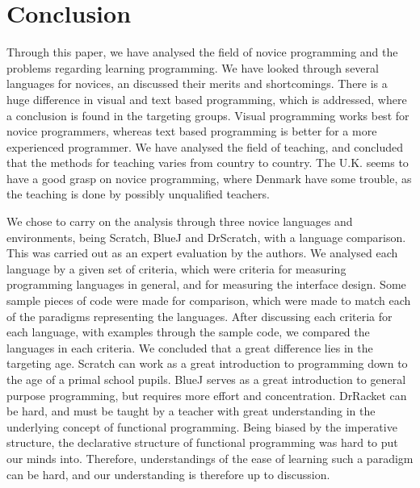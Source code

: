 \chapter{Conclusion}
\label{chap:conclusion}

Through this paper, we have analysed the field of novice programming and the problems regarding learning programming. We have looked through several languages for novices, an discussed their merits and shortcomings. There is a huge difference in visual and text based programming, which is addressed, where a conclusion is found in the targeting groups. Visual programming works best for novice programmers, whereas text based programming is better for a more experienced programmer. We have analysed the field of teaching, and concluded that the methods for teaching varies from country to country. The U.K. seems to have a good grasp on novice programming, where Denmark have some trouble, as the teaching is done by possibly unqualified teachers.

We chose to carry on the analysis through three novice languages and environments, being Scratch, BlueJ and DrScratch, with a language comparison. This was carried out as an expert evaluation by the authors. We analysed each language by a given set of criteria, which were criteria for measuring programming languages in general, and for measuring the interface design. Some sample pieces of code were made for comparison, which were made to match each of the paradigms representing the languages. After discussing each criteria for each language, with examples through the sample code, we compared the languages in each criteria. We concluded that a great difference lies in the targeting age. Scratch can work as a great introduction to programming down to the age of a primal school pupils. BlueJ serves as a great introduction to general purpose programming, but requires more effort and concentration. DrRacket can be hard, and must be taught by a teacher with great understanding in the underlying concept of functional programming. Being biased by the imperative structure, the declarative structure of functional programming was hard to put our minds into. Therefore, understandings of the ease of learning such a paradigm can be hard, and our understanding is therefore up to discussion.